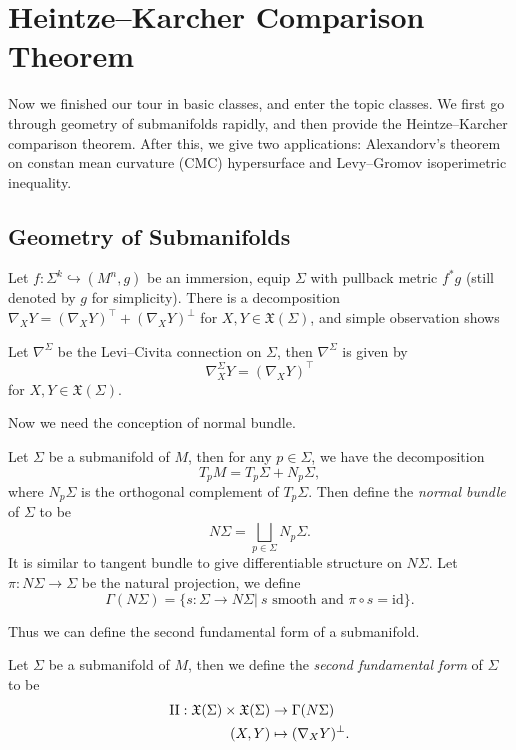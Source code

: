 \chapter{Heintze--Karcher Comparison Theorem}

Now we finished our tour in basic classes, and enter the topic classes.
We first go through geometry of submanifolds rapidly, and then provide the Heintze--Karcher comparison theorem.
After this, we give two applications:
Alexandorv's theorem on constan mean curvature (CMC) hypersurface and Levy--Gromov isoperimetric inequality.

\section{Geometry of Submanifolds}

Let $f:\Sigma^k\hookrightarrow(M^n,g)$ be an immersion, equip $\Sigma$ with pullback metric $f^*g$ (still denoted by $g$ for simplicity).
There is a decomposition $\nabla_XY=(\nabla_XY)^\top+(\nabla_XY)^\perp$ for $X,Y\in\mathfrak{X}(\Sigma)$, and simple observation shows
\begin{prop}
    Let $\nabla^\Sigma$ be the Levi--Civita connection on $\Sigma$, then $\nabla^\Sigma$ is given by
    \[\nabla^\Sigma_XY=(\nabla_XY)^\top\]
    for $X,Y\in\mathfrak{X}(\Sigma)$.
\end{prop}

Now we need the conception of normal bundle.
\begin{defn}
    Let $\Sigma$ be a submanifold of $M$, then for any $p\in\Sigma$, we have the decomposition
    \[T_pM=T_p\Sigma+N_p\Sigma,\]
    where $N_p\Sigma$ is the orthogonal complement of $T_p\Sigma$.
    Then define the \emph{normal bundle} of $\Sigma$ to be
    \[N\Sigma=\bigsqcup_{p\in\Sigma}N_p\Sigma.\]
    It is similar to tangent bundle to give differentiable structure on $N\Sigma$.
    Let $\pi:N\Sigma\to\Sigma$ be the natural projection, we define
    \[\Gamma(N\Sigma)=\{s:\Sigma\to N\Sigma|\ s\text{ smooth and }\pi\circ s=\mathrm{id}\}.\]
\end{defn}

Thus we can define the second fundamental form of a submanifold.
\begin{defn}
    Let $\Sigma$ be a submanifold of $M$, then we define the \emph{second fundamental form} of $\Sigma$ to be
    \begin{align*}
        \operatorname{II}:\mathfrak{X}(\Sigma)\times\mathfrak{X}(\Sigma)&\to\Gamma(N\Sigma)\\
        (X,Y)&\mapsto(\nabla_XY)^\perp.
    \end{align*}
\end{defn}

